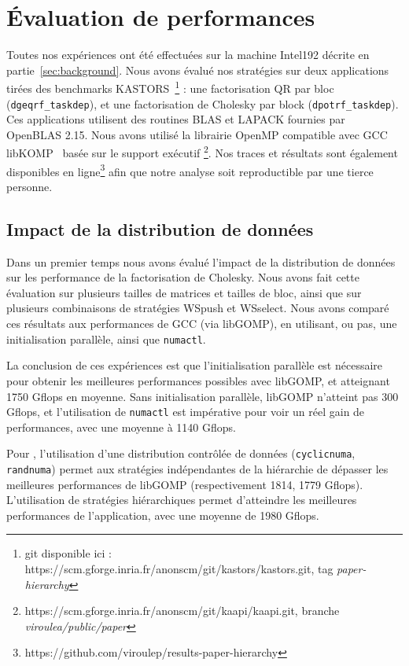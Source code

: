 \documentclass[parallelisme]{compas2016}
\begin{document}
\vspace*{-1ex}
\section{Évaluation de performances}
\label{sec:performances-evaluation}
Toutes nos expériences ont été effectuées sur la machine Intel192 décrite en partie~\ref{sec:background}.
Nous avons évalué nos stratégies sur deux applications tirées des benchmarks
KASTORS~\cite{virouleau:hal-01081974}\footnote{git disponible ici : https://scm.gforge.inria.fr/anonscm/git/kastors/kastors.git, tag \emph{paper-hierarchy}} :
une factorisation QR par bloc (\verb/dgeqrf_taskdep/), et une factorisation de
Cholesky par block (\verb/dpotrf_taskdep/).
Ces applications utilisent des routines BLAS et LAPACK fournies par OpenBLAS 2.15.
Nous avons utilisé la librairie OpenMP compatible avec GCC libKOMP~\cite{libkomp} basée
sur le support exécutif \kaapi\footnote{https://scm.gforge.inria.fr/anonscm/git/kaapi/kaapi.git,
branche \emph{viroulea/public/paper}}.
Nos traces et résultats sont également disponibles en ligne\footnote{https://github.com/viroulep/results-paper-hierarchy} afin que notre analyse
soit reproductible par une tierce personne.


\vspace*{-1ex}
\subsection{Impact de la distribution de données}

Dans un premier temps nous avons évalué l'impact de la distribution de données sur
les performance de la factorisation de Cholesky. Nous avons fait cette évaluation sur plusieurs
tailles de matrices et tailles de bloc, ainsi que sur plusieurs combinaisons
de stratégies WSpush et WSselect. Nous avons comparé ces résultats aux performances de GCC (via libGOMP),
en utilisant, ou pas, une initialisation parallèle, ainsi que \verb/numactl/.

La conclusion de ces expériences est que l'initialisation parallèle est nécessaire
pour obtenir les meilleures performances possibles avec libGOMP, et atteignant 1750 Gflops en moyenne.
Sans initialisation parallèle, libGOMP n'atteint pas 300 Gflops, et l'utilisation de
\verb/numactl/ est impérative pour voir un réel gain de performances, avec une moyenne à 1140 Gflops.

Pour \kaapi, l'utilisation d'une distribution contrôlée de données (\verb/cyclicnuma/,
\verb/randnuma/) permet aux stratégies indépendantes de la hiérarchie de dépasser
les meilleures performances de libGOMP (respectivement 1814, 1779 Gflops).
L'utilisation de stratégies hiérarchiques permet d'atteindre les meilleures performances
de l'application, avec une moyenne de 1980 Gflops.
\end{document}
